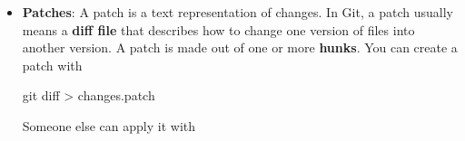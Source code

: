\documentclass{report}
\begin{document}
\begin{itemize}
\begin{bashcode}
                index 83db48f..f735c2d 100644
                --- a/file.txt
                +++ b/file.txt
                @@ -1,5 +1,5 @@
                line 1
                line 2
                -old line
                +new line
                line 4
                line 5
            \end{bashcode}
            \bigbreak \noindent 
            This part is the hunk:
            \bigbreak \noindent 
            \begin{bashcode}
                @@ -1,5 +1,5 @@
                line 1
                line 2
                -old line
                +new line
                line 4
                line 5
            \end{bashcode}
            \begin{itemize}
                \item The -old line means that line was removed.
                \item The +new line means that line was added.
            \end{itemize}
            The unchanged lines around it are context, included so Git and humans can understand where the change belongs.
            \bigbreak \noindent 
            \begin{bashcode}
                @@ -1,5 +1,5 @@
            \end{bashcode}
            \bigbreak \noindent 
            is the \textbf{hunk header}. It means:
            \begin{bashcode}
                -1,5   old file: starting at line 1, show 5 lines
                +1,5   new file: starting at line 1, show 5 lines
            \end{bashcode}
            \bigbreak \noindent 
            So the hunk describes a change from one version of the file to another.
        \item \textbf{Patches}: A patch is a text representation of changes. In Git, a patch usually means a \textbf{diff file} that describes how to change one version of files into another version. 
            \bigbreak \noindent 
            A patch is made out of one or more \textbf{hunks}.
            \bigbreak \noindent 
            You can create a patch with
            \bigbreak \noindent 
            \begin{bashcode}
                git diff > changes.patch
            \end{bashcode}
            \bigbreak \noindent 
            Someone else can apply it with
            \bigbreak \noindent 

\end{itemize}
\end{document}
